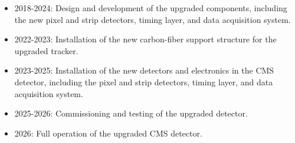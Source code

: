 \begin{itemize}

\item 2018-2024: Design and development of the upgraded components, including the new pixel and strip detectors, timing layer, and data acquisition system.

\item 2022-2023: Installation of the new carbon-fiber support structure for the upgraded tracker.

\item 2023-2025: Installation of the new detectors and electronics in the CMS detector, including the pixel and strip detectors, timing layer, and data acquisition system.

\item 2025-2026: Commissioning and testing of the upgraded detector.

\item 2026: Full operation of the upgraded CMS detector.

\end{itemize}






